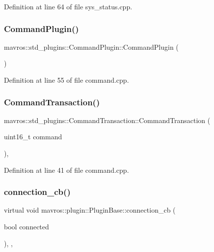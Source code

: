 Definition at line 64 of file sys\+\_\+status.\+cpp.

\mbox{\label{group__plugin_ga940a7bdc408198dd8571ee68b095b0f2}} 
\subsubsection{\texorpdfstring{CommandPlugin()}{CommandPlugin()}}
{\footnotesize\ttfamily mavros\+::std\+\_\+plugins\+::\+Command\+Plugin\+::\+Command\+Plugin (\begin{DoxyParamCaption}{ }\end{DoxyParamCaption})\hspace{0.3cm}{\ttfamily [inline]}}



Definition at line 55 of file command.\+cpp.

\mbox{\label{group__plugin_ga658577aae97bc7739a5bfbd71e16af2e}} 
\subsubsection{\texorpdfstring{CommandTransaction()}{CommandTransaction()}}
{\footnotesize\ttfamily mavros\+::std\+\_\+plugins\+::\+Command\+Transaction\+::\+Command\+Transaction (\begin{DoxyParamCaption}\item[{uint16\+\_\+t}]{command }\end{DoxyParamCaption})\hspace{0.3cm}{\ttfamily [inline]}, {\ttfamily [explicit]}}



Definition at line 41 of file command.\+cpp.

\mbox{\label{group__plugin_gadad2eaef432d01ad059a6edb40ab8443}} 
\subsubsection{\texorpdfstring{connection\_cb()}{connection\_cb()}}
{\footnotesize\ttfamily virtual void mavros\+::plugin\+::\+Plugin\+Base\+::connection\+\_\+cb (\begin{DoxyParamCaption}\item[{bool}]{connected }\end{DoxyParamCaption})\hspace{0.3cm}{\ttfamily [inline]}, {\ttfamily [protected]}, {\ttfamily [virtual]}}

